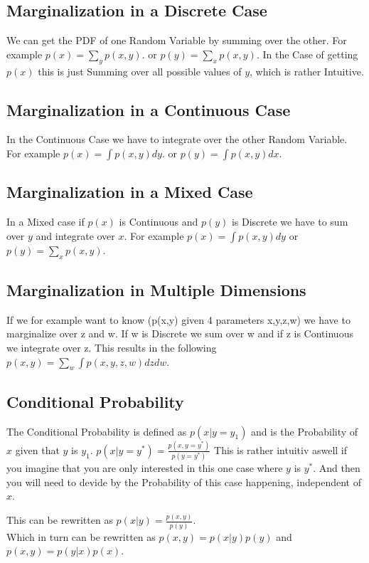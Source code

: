 \documentclass[a4paper]{article}
\begin{document}
\subsection{Marginalization in a Discrete Case}
We can get the PDF of one Random Variable by summing over the other. For example $p(x) = \sum_{y} p(x,y)$. or $p(y) = \sum_{x} p(x,y)$.
In the Case of getting $p(x)$ this is just Summing over all possible values of $y$, which is rather Intuitive. 

\subsection{Marginalization in a Continuous Case}
In the Continuous Case we have to integrate over the other Random Variable. For example $p(x) = \int p(x,y) dy$. or $p(y) = \int p(x,y) dx$.

\subsection{Marginalization in a Mixed Case}
In a Mixed case if $p(x)$ is Continuous and $p(y)$ is Discrete we have to sum over $y$ and integrate over $x$. For example $p(x) = \int p(x,y) dy$ or $p(y) = \sum_{x} p(x,y)$.

\subsection{Marginalization in Multiple Dimensions}
If we for example want to know (p(x,y) given 4 parameters x,y,z,w) we have to marginalize over z and w. If w is Discrete we sum over w and if z is Continuous we integrate over z. This results in the following $p(x,y) = \sum_{w} \int p(x,y,z,w) dz dw$.

\subsection{Conditional Probability}
The Conditional Probability is defined as $p(x|y = y_1)$ and is the Probability of $x$ given that $y$ is $y_1$. 
 $p(x|y = y^{*}) = \frac{p(x,y = y^{*})}{p( y = y^{*})}$
 This is rather intuitiv aswell if you imagine that you are only interested in this one case where $y$ is $y^{*}$. And then you will need to devide by the Probability of this case happening, independent of $x$.

This can be rewritten as $p(x|y) = \frac{p(x,y)}{p(y)}$. \\
Which in turn can be rewritten as $p(x,y) = p(x|y) p(y)$ and $p(x,y) = p(y|x) p(x)$.
\end{document}
